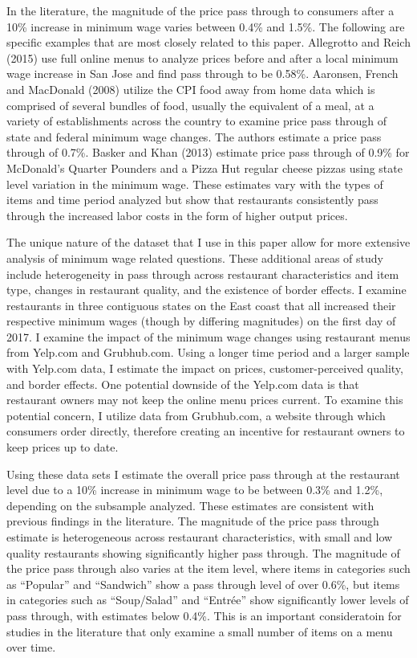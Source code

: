 \documentclass[11pt]{article}
\begin{document}
In the literature, the magnitude of the price pass through to consumers after a 10\% increase in minimum wage varies between 0.4\% and 1.5\%. The following are specific examples that are most closely related to this paper. Allegrotto and Reich (2015) use full online menus to analyze prices before and after a local minimum wage increase in San Jose and find pass through to be 0.58\%. Aaronsen, French and MacDonald (2008) utilize the CPI food away from home data which is comprised of several bundles of food, usually the equivalent of a meal, at a variety of establishments across the country to examine price pass through of state and federal minimum wage changes. The authors estimate a price pass through of 0.7\%. Basker and Khan (2013) estimate price pass through of 0.9\% for McDonald's Quarter Pounders and a Pizza Hut regular cheese pizzas using state level variation in the minimum wage. These estimates vary with the types of items and time period analyzed but show that restaurants consistently pass through the increased labor costs in the form of higher output prices. 


The unique nature of the dataset that I use in this paper allow for more extensive analysis of minimum wage related questions. These additional areas of study include heterogeneity in pass through across restaurant characteristics and item type, changes in restaurant quality, and the existence of border effects. I examine restaurants in three contiguous states on the East coast that all increased their respective minimum wages (though by differing magnitudes) on the first day of 2017. I examine the impact of the minimum wage changes using restaurant menus from Yelp.com and Grubhub.com. Using a longer time period and a larger sample with Yelp.com data, I estimate the impact on prices, customer-perceived quality, and border effects. One potential downside of the Yelp.com data is that restaurant owners may not keep the online menu prices current. To examine this potential concern, I utilize data from Grubhub.com, a website through which consumers order directly, therefore creating an incentive for restaurant owners to keep prices up to date.

Using these data sets I estimate the overall price pass through at the restaurant level due to a 10\% increase in minimum wage to be between 0.3\% and 1.2\%, depending on the subsample analyzed. These estimates are consistent with previous findings in the literature. The magnitude of the price pass through estimate is heterogeneous across restaurant characteristics, with small and low quality restaurants showing significantly higher pass through. The magnitude of the price pass through also varies at the item level, where items in categories such as ``Popular'' and ``Sandwich'' show a pass through level of over 0.6\%, but items in categories such as ``Soup/Salad'' and ``Entrée'' show significantly lower levels of pass through, with estimates below 0.4\%. This is an important consideratoin for studies in the literature that only examine a small number of items on a menu over time. 
\end{document}
